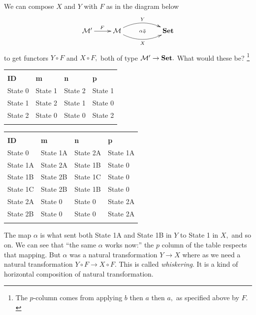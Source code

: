 \documentclass[CT4S-EN-RU]{subfiles}
\begin{document}
\begin{exampleENG}[Whiskering]
We can compose $X$ and $Y$ with $F$ as in the diagram below
$$
\xymatrix{\mcM'\ar[r]^F&\mcM\ar@/^1pc/[rr]^Y\ar@/_1pc/[rr]_X\ar@{}[rr]|{\alpha\Down}&&\Set}
$$
to get functors $Y\circ F$ and $X\circ F,$ both of type $\mathcal{M}'\rightarrow{\mathbf{Set}}.$ What would these be?
\footnote{The $p$-column comes from applying $b$ then $a$ then $a,$ as specified above by $F.$}
\begin{center}\footnotesize
\begin{tabular}{| l || l | l | l |}\bhline
\multicolumn{4}{|c|}{$X\circ F$}\\\bhline
{\bf ID}&{\bf m}&{\bf n}&{\bf p}\\\bbhline
State 0&State 1&State 2&State 1\\\hline
State 1& State 2& State 1&State 0\\\hline
State 2&State 0&State 0&State 2\\\bhline
\end{tabular}
\hspace{.5in}
\begin{tabular}{| l || l | l | l |}\bhline
\multicolumn{4}{|c|}{$Y\circ F$}\\\bhline
{\bf ID}&{\bf m}&{\bf n}&{\bf p}\\\bbhline
State 0&State 1A&State 2A&State 1A\\\hline
State 1A& State 2A& State 1B&State 0\\\hline
State 1B& State 2B& State 1C&State 0\\\hline
State 1C&State 2B&State 1B&State 0\\\hline
State 2A&State 0&State 0&State 2A\\\hline
State 2B&State 0&State 0&State 2A\\\bhline
\end{tabular}
\end{center}

The map $\alpha$ is what sent both State 1A and State 1B in $Y$ to State 1 in $X,$ and so on. We can see that “the same $\alpha$ works now:” the $p$ column of the table respects that mapping. But $\alpha$ was a natural transformation $Y\to X$ where as we need a natural transformation $Y\circ F\to X\circ F.$ This is called {\em whiskering}. It is a kind of horizontal composition of natural transformation.
\end{exampleENG}

\begin{exampleRUS}[Whiskering]\label{ex:whiskering}
\end{exampleRUS}
\end{document}

